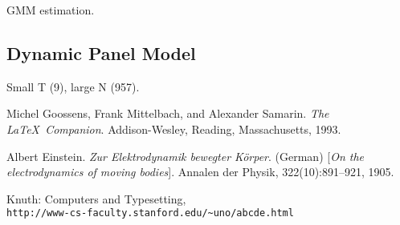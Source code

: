 \documentclass[11pt]{article}
\begin{document}
GMM estimation.

\subsection{Dynamic Panel Model}

Small T (9), large N (957). 


\begin{thebibliography}{9}

Michel Goossens, Frank Mittelbach, and Alexander Samarin. 
\textit{The \LaTeX\ Companion}. 
Addison-Wesley, Reading, Massachusetts, 1993.

Albert Einstein. 
\textit{Zur Elektrodynamik bewegter K{\"o}rper}. (German) 
[\textit{On the electrodynamics of moving bodies}]. 
Annalen der Physik, 322(10):891–921, 1905.

Knuth: Computers and Typesetting,
\\\texttt{http://www-cs-faculty.stanford.edu/\~{}uno/abcde.html}
\end{thebibliography}
\end{document}
